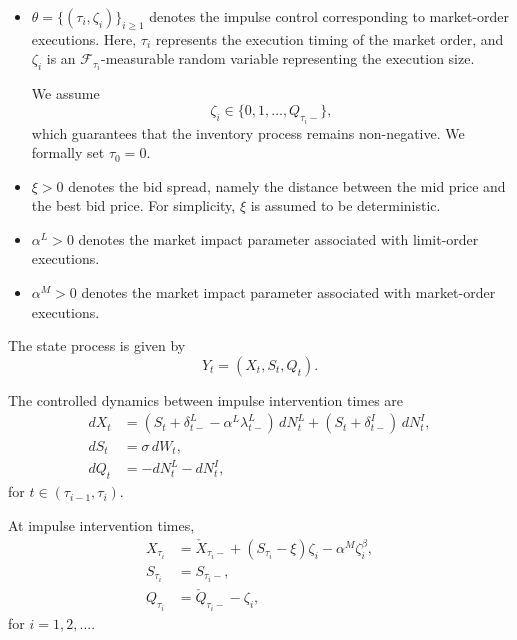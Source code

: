 \documentclass[12pt]{article}
\begin{document}
\begin{itemize}
Here,
$\lambda^L>0$,
$\lambda^I>0$,
and $\kappa>0$
are constants.
The quantities
\[
\lambda^L e^{-\kappa\delta^L_t},
\qquad
\lambda^I e^{-\kappa\delta^I_t}
\]
can be interpreted as the execution rates of limit-order and internal executions, respectively.
Larger values of $\delta^L_t$ and $\delta^I_t$
correspond to less aggressive quotes and therefore lower execution frequencies.

\item
$\theta=\{(\tau_i,\zeta_i)\}_{i\ge1}$ denotes the impulse control
corresponding to market-order executions.
Here, $\tau_i$ represents the execution timing of the market order,
and $\zeta_i$ is an
$\mathcal F_{\tau_i}$-measurable random variable representing the execution size.

We assume
\[
\zeta_i\in\{0,1,\ldots,Q_{\tau_i-}\},
\]
which guarantees that the inventory process remains non-negative.
We formally set $\tau_0=0$.

\item
$\xi>0$ denotes the bid spread, namely the distance between the mid price and the best bid price.
For simplicity, $\xi$ is assumed to be deterministic.

\item
$\alpha^L>0$ denotes the market impact parameter associated with limit-order executions.

\item
$\alpha^M>0$ denotes the market impact parameter associated with market-order executions.

\end{itemize}

The state process is given by
\[
Y_t=(X_t,S_t,Q_t).
\]

The controlled dynamics between impulse intervention times are
\begin{align}
dX_t
&=
(S_t+\delta^L_{t-}-\alpha^L\lambda^L_{t-})\,dN^L_t
+
(S_t+\delta^I_{t-})\,dN^I_t,
\label{eq:dX}
\\
dS_t
&=
\sigma\,dW_t,
\label{eq:dS}
\\
dQ_t
&=
-dN^L_t-dN^I_t,
\label{eq:dQ}
\end{align}
for $t\in(\tau_{i-1},\tau_i)$.

At impulse intervention times,
\begin{align}
X_{\tau_i}
&=
\check X_{\tau_i-}
+
(S_{\tau_i}-\xi)\zeta_i
-
\alpha^M\zeta_i^\beta,
\label{eq:X}
\\
S_{\tau_i}
&=
S_{\tau_i-},
\label{eq:S}
\\
Q_{\tau_i}
&=
\check Q_{\tau_i-}-\zeta_i,
\label{eq:Q}
\end{align}
for $i=1,2,\ldots$.
\end{document}
